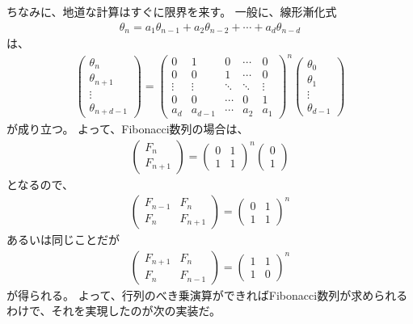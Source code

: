 ちなみに、地道な計算はすぐに限界を来す。
一般に、線形漸化式
\begin{align*}
\theta_n = a_1\theta_{n-1} + a_2\theta_{n-2} + \cdots + a_d\theta_{n-d}
\end{align*}
は、
\begin{align*}
\begin{pmatrix}
\theta_{n}\\
\theta_{n+1}\\
\vdots\\
\theta_{n+d-1}
\end{pmatrix}
=
\begin{pmatrix}
0 & 1 & 0 & \cdots & 0\\
0 & 0 & 1 & \cdots & 0\\
\vdots & \vdots & \ddots& \ddots & \vdots\\
0 &0&\cdots&0& 1\\
a_d & a_{d-1} & \cdots & a_{2} & a_{1}
\end{pmatrix}^n
\begin{pmatrix}
\theta_0\\
\theta_1\\
\vdots\\
\theta_{d-1}
\end{pmatrix}
\end{align*}
が成り立つ。
よって、Fibonacci数列の場合は、
\begin{align*}
\begin{pmatrix}
F_{n} \\
F_{n+1}
\end{pmatrix} = 
\begin{pmatrix}
0 & 1 \\
1 & 1
\end{pmatrix}^n
\begin{pmatrix}
0 \\
1
\end{pmatrix}
\end{align*}
となるので、
\begin{align*}
\begin{pmatrix}
F_{n-1} & F_n \\
F_{n} & F_{n+1}
\end{pmatrix} = 
\begin{pmatrix}
0 & 1 \\
1 & 1
\end{pmatrix}^n
\end{align*}
あるいは同じことだが
\begin{align*}
\begin{pmatrix}
F_{n+1} & F_n \\
F_{n} & F_{n-1}
\end{pmatrix} = 
\begin{pmatrix}
1 & 1 \\
1 & 0
\end{pmatrix}^n
\end{align*}
が得られる。
よって、行列のべき乗演算ができればFibonacci数列が求められるわけで、それを実現したのが次の実装だ。

